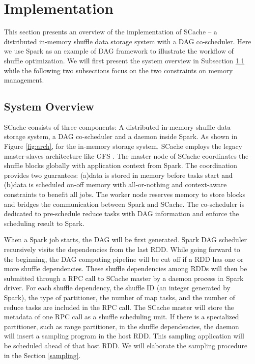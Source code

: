 \section{Implementation}\label{impl}
This section presents an overview of the implementation of SCache -- a distributed in-memory shuffle data storage system with a DAG co-scheduler. Here we use Spark as an example of DAG framework to illustrate the workflow of shuffle optimization. We will first present the system overview in Subsection \ref{arch} while the following two subsections focus on the two constraints on memory management.

\subsection{System Overview}\label{arch}
SCache consists of three components: A distributed in-memory shuffle data storage system, a DAG co-scheduler and a daemon inside Spark. As shown in Figure \ref{fig:arch}, for the in-memory storage system, SCache employs the legacy master-slaves architecture like GFS \cite{gfs}. The master node of SCache coordinates the shuffle blocks globally with application context from Spark. The coordination provides two guarantees: (a)data is stored in memory before tasks start and (b)data is scheduled on-off memory with all-or-nothing and context-aware constraints to benefit all jobs. The worker node reserves memory to store blocks and bridges the communication between Spark and SCache. The co-scheduler is dedicated to pre-schedule reduce tasks with DAG information and enforce the scheduling result to Spark.

When a Spark job starts, the DAG will be first generated. Spark DAG scheduler recursively visits the dependencies from the last RDD. While going forward to the beginning, the DAG computing pipeline will be cut off if a RDD has one or more shuffle dependencies. These shuffle dependencies among RDDs will then be submitted through a RPC call to SCache master by a daemon process in Spark driver. For each shuffle dependency, the shuffle ID (an integer generated by Spark), the type of partitioner, the number of map tasks, and the number of reduce tasks are included in the RPC call. The SCache master will store the metadata of one RPC call as a shuffle scheduling unit. If there is a specialized partitioner, such as range partitioner, in the shuffle dependencies, the daemon will insert a sampling program in the host RDD. This sampling application will be scheduled ahead of that host RDD. We will elaborate the sampling procedure in the Section \ref{sampling}.

